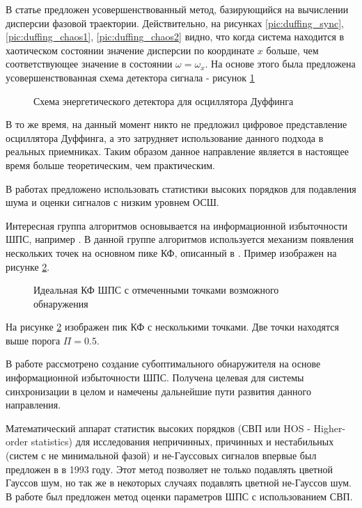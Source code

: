 В статье \cite{chaos_chen} предложен усовершенствованный метод, базирующийся на вычислении дисперсии
фазовой траектории. Действительно, на рисунках \ref{pic:duffing_sync}, \ref{pic:duffing_chaos1},
\ref{pic:duffing_chaos2} видно, что когда система находится в хаотическом состоянии значение
дисперсии по координате ${x}$ больше, чем соответствующее значение в состоянии $\omega = \omega_{x}$.
На основе этого была предложена усовершенствованная схема детектора сигнала - рисунок \ref{pic:chaos_energy_detector}
\begin{figure}[h]
	\center{}
	\caption{Схема энергетического детектора для осциллятора Дуффинга}
	\label{pic:chaos_energy_detector}
\end{figure}

В то же время, на данный момент никто не предложил цифровое представление осциллятора Дуффинга, а это затрудняет использование данного подхода
в реальных приемниках. Таким образом данное направление является в настоящее время больше теоретическим, чем практическим.

В работах \cite{hos_petropulu, hos_zhao} предложено использовать статистики высоких порядков для подавления шума и оценки
сигналов с низким уровнем ОСШ.

Интересная группа алгоритмов основывается на информационной избыточности ШПС, например \cite{phd_che}. В данной
группе алгоритмов используется механизм появления нескольких точек на основном пике КФ, описанный в \cite{kaplan}. Пример
изображен на рисунке \ref{pic:sec1_peak_tcd}.
\begin{figure}[h]
	\center{}
	\caption{Идеальная КФ ШПС с отмеченными точками возможного обнаружения}
	\label{pic:sec1_peak_tcd}
\end{figure}

На рисунке \ref{pic:sec1_peak_tcd} изображен пик КФ с несколькими точками. Две точки находятся выше порога ${\Pi=0.5}$.

В работе \cite{phd_che} рассмотрено создание субоптимального обнаружителя на основе информационной избыточности ШПС.
Получена целевая для системы синхронизации в целом и намечены дальнейшие пути развития данного направления.

Математический аппарат статистик высоких порядков (СВП или HOS - Higher-order statistics)
для исследования непричинных, причинных и нестабильных
(систем с не минимальной фазой) и не-Гауссовых сигналов впервые был предложен в \cite{hos_petropulu} в 1993 году.
Этот метод позволяет не только подавлять цветной Гауссов шум, но так же в некоторых случаях подавлять
цветной не-Гауссов шум. В работе \cite{hos_zhao} был предложен метод оценки параметров ШПС с использованием СВП.


